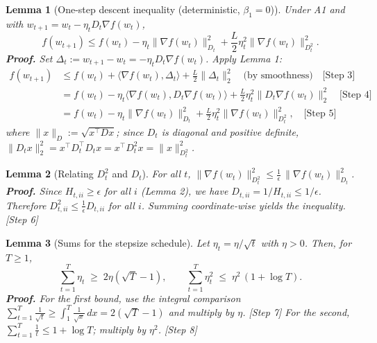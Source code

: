 \documentclass[11pt]{article}
\newtheorem{lemma}{Lemma}
\begin{document}
\begin{lemma}[One-step descent inequality (deterministic, $\beta_1=0$)]
Under A1 and with $w_{t+1}=w_t - \eta_t D_t \nabla f(w_t)$,
\[
f(w_{t+1}) \le f(w_t) - \eta_t \|\nabla f(w_t)\|_{D_t}^2 + \frac{L}{2}\eta_t^2 \|\nabla f(w_t)\|_{D_t^2}^2.
\]
\textbf{Proof.} Set $\Delta_t:=w_{t+1}-w_t=-\eta_t D_t \nabla f(w_t)$. Apply Lemma 1:
\[
\begin{aligned}
f(w_{t+1}) &\le f(w_t) + \langle \nabla f(w_t), \Delta_t\rangle + \frac{L}{2}\|\Delta_t\|_2^2 \quad\text{(by smoothness)} \quad\text{[Step 3]}\\
&= f(w_t) - \eta_t \langle \nabla f(w_t), D_t \nabla f(w_t)\rangle + \frac{L}{2}\eta_t^2 \| D_t \nabla f(w_t)\|_2^2 \quad\text{[Step 4]}\\
&= f(w_t) - \eta_t \|\nabla f(w_t)\|_{D_t}^2 + \frac{L}{2}\eta_t^2 \|\nabla f(w_t)\|_{D_t^2}^2, \quad\text{[Step 5]}
\end{aligned}
\]
where $\|x\|_{D}:=\sqrt{x^\top D x}$; since $D_t$ is diagonal and positive definite, $\|D_t x\|_2^2 = x^\top D_t^\top D_t x = x^\top D_t^2 x = \|x\|_{D_t^2}^2$.
\end{lemma}

\begin{lemma}[Relating $D_t^2$ and $D_t$]
For all $t$, $\|\nabla f(w_t)\|_{D_t^2}^2 \le \frac{1}{\epsilon}\, \|\nabla f(w_t)\|_{D_t}^2$.
\textbf{Proof.} Since $H_{t,ii}\ge \epsilon$ for all $i$ (Lemma 2), we have $D_{t,ii} = 1/H_{t,ii} \le 1/\epsilon$. Therefore $D_{t,ii}^2 \le \frac{1}{\epsilon} D_{t,ii}$ for all $i$. Summing coordinate-wise yields the inequality. [Step 6]
\end{lemma}

\begin{lemma}[Sums for the stepsize schedule]
Let $\eta_t=\eta/\sqrt{t}$ with $\eta>0$. Then, for $T\ge 1$,
\[
\sum_{t=1}^T \eta_t \;\ge\; 2\eta(\sqrt{T}-1),\qquad \sum_{t=1}^T \eta_t^2 \;\le\; \eta^2\,(1+\log T).
\]
\textbf{Proof.} For the first bound, use the integral comparison $\sum_{t=1}^T \frac{1}{\sqrt{t}}\ge \int_{1}^{T} \frac{1}{\sqrt{x}}\,dx = 2(\sqrt{T}-1)$ and multiply by $\eta$. [Step 7]
For the second, $\sum_{t=1}^T \frac{1}{t} \le 1 + \log T$; multiply by $\eta^2$. [Step 8]
\end{lemma}
\end{document}
